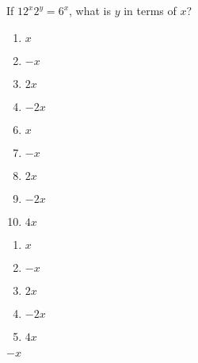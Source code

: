 



  If $12^{x}2^{y} = 6^{x}$, what is $y$ in terms of $x$?\\


\ifsat
	\begin{enumerate}[label=\Alph*)]
		\item   $x$
		\item  $-x$%
		\item  $2x$
		\item  $-2x$
	\end{enumerate}
\else
\fi

\ifacteven
	\begin{enumerate}[label=\textbf{\Alph*.},itemsep=\fill,align=left]
		\setcounter{enumii}{5}
		\item   $x$
		\item  $-x$%
		\item  $2x$
		\addtocounter{enumii}{1}
		\item  $-2x$
		\item   $4x$
	\end{enumerate}
\else
\fi

\ifactodd
	\begin{enumerate}[label=\textbf{\Alph*.},itemsep=\fill,align=left]
		\item   $x$
		\item  $-x$%
		\item  $2x$
		\item  $-2x$
		\item   $4x$
	\end{enumerate}
\else
\fi

\ifgridin
  $-x$%
		
\else
\fi

